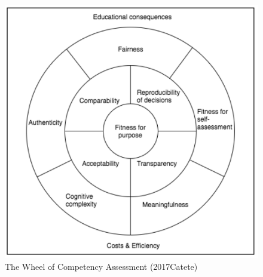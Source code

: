 \begin{figure}
\includegraphics[scale=0.6]{figures/AdaptedQualityCriteriaCatete.png}
\caption{The Wheel of Competency Assessment (2017Catete)}\label{fig:AdaptedQualityCriteriaCatete}
\end{figure}



